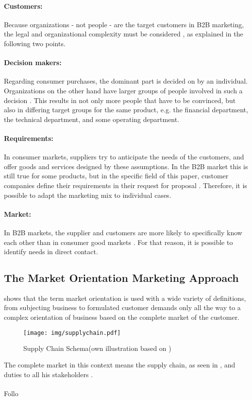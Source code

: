 \paragraph*{Customers:} 
Because organizations - not people - are the target customers in B2B marketing, the legal and organizational complexity must be considered \parencite[cf.][21]{Backhaus.2015b}, as explained in the following two points.

\paragraph*{Decision makers:} 
Regarding consumer purchases, the dominant part is decided on by an individual. Organizations on the other hand have larger groups of people involved in such a decision \parencite[cf.][21]{Backhaus.2015b}. This results in not only more people that have to be convinced, but also in differing target groups for the same product, e.g. the financial department, the technical department, and some operating department. 

\paragraph*{Requirements:} 
In consumer markets, suppliers try to anticipate the needs of the customers, and offer goods and services designed by these assumptions. In the B2B market this is still true for some products, but in the specific field of this paper, customer companies define their requirements in their request for proposal \parencite[cf.][22]{Backhaus.2015b}. Therefore, it is possible to adapt the marketing mix to individual cases.

\paragraph*{Market:} 
In B2B markets, the supplier and customers are more likely to specifically know each other than in consumer good markets \parencite[cf.][2]{Backhaus.2015b}. For that reason, it is possible to identify needs in direct contact.

\subsection{The Market Orientation Marketing Approach}
\textcite[9-10]{Claen.2016} shows that the term market orientation is used with a wide variety of definitions, from subjecting business to formulated customer demands only all the way to a complex orientation of business based on the complete market of the customer.
\begin{figure}[H]
	\texttt{[image: img/supplychain.pdf]}
	\caption[Supply Chain Schema]{Supply Chain Schema(own illustration based on \protect\cite{SouthwestTech})}
    	\label{fig:supplychain}
\end{figure}
The complete market in this context means the supply chain, as seen in , and duties to all his stakeholders \parencite[cf.][22-23]{Claen.2016}.

\paragraph{} Follo